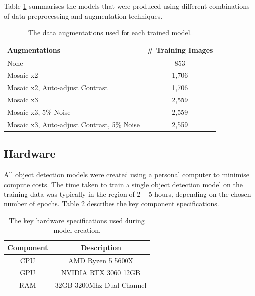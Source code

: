 \documentclass{thesis}
\begin{document}
Table \ref{table:model-augmentations} summarises the models that were produced using different combinations of data preprocessing and augmentation techniques.

\begin{table}[ht!]
    \centering
    \begin{tabular}{|l| |c|} 
     \hline
      \textbf{Augmentations} & \textbf{\# Training Images} \\
     \hline\hline
     None & 853 \\
     Mosaic x2 & 1,706  \\
     Mosaic x2, Auto-adjust Contrast & 1,706  \\
     Mosaic x3 & 2,559\\
     Mosaic x3, 5\% Noise & 2,559 \\
     Mosaic x3, Auto-adjust Contrast, 5\% Noise & 2,559 \\
     \hline
    \end{tabular}
    \hspace{100mm}
    \caption{The data augmentations used for each trained model.}
    \label{table:model-augmentations}
\end{table}

\subsection{Hardware}

All object detection models were created using a personal computer to minimise compute costs. The time taken to train a single object detection model on the training data was typically in the region of 2 -- 5 hours, depending on the chosen number of epochs. Table \ref{table:hardware} describes the key component specifications.

\begin{table}[ht!]
    \centering
    \begin{tabular}{|c| |c|} 
     \hline
     \textbf{Component} & \textbf{Description} \\ [0.5ex] 
     \hline\hline
     CPU & AMD Ryzen 5 5600X \\
     GPU & NVIDIA RTX 3060 12GB \\
     RAM & 32GB 3200Mhz Dual Channel  \\
     \hline
    \end{tabular}
    \hspace{100mm}
    \caption{The key hardware specifications used during model creation.}
    \label{table:hardware}
\end{table}
\end{document}
